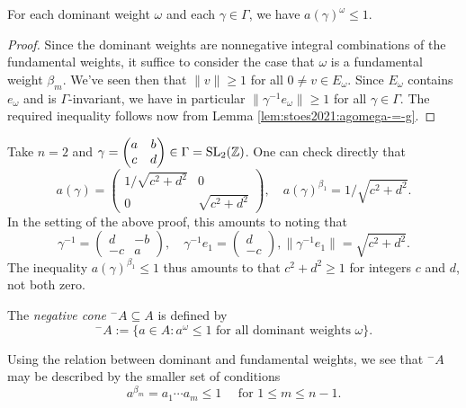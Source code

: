 \documentclass[reqno]{amsart} 
\begin{document}
\begin{lemma}\label{lem:stoes2021:each-dominant-weight}
  For each dominant weight $\omega$ and each $\gamma \in \Gamma$, we have $a(\gamma)^{\omega} \leq 1$.
\end{lemma}
\begin{proof}
  Since the dominant weights are nonnegative integral combinations of the fundamental weights, it suffice to consider the case that $\omega$ is a fundamental weight $\beta_m$.  We've seen then that $\|v\| \geq 1$ for all $0 \neq v \in E_\omega$.  Since $E_\omega$ contains $e_\omega$ and is $\Gamma$-invariant, we have in particular $\|\gamma^{-1} e_\omega \| \geq 1$ for all $\gamma \in \Gamma$.  The required inequality follows now from Lemma \ref{lem:stoes2021:agomega-=-g}.
\end{proof}

\begin{example}
  Take $n = 2$ and $\gamma = 
  \begin{pmatrix}
    a & b \\
    c & d
  \end{pmatrix}
  \in \Gamma = \operatorname{SL}_2(\mathbb{Z})$.  One can check directly that
  \begin{equation*}
    a (\gamma ) = 
    \begin{pmatrix}
      1/ \sqrt{c^2 + d^2} & 0 \\
      0 & \sqrt{c^2 + d^2}
    \end{pmatrix}
    , \quad a(\gamma)^{\beta_1} = 1/ \sqrt{c^2 + d^2}.
  \end{equation*}
  In the setting of the above proof, this amounts to noting that
  \begin{equation*}
    \gamma^{-1} = 
    \begin{pmatrix}
      d & -b \\
      -c & a
    \end{pmatrix}
    , \quad \gamma^{-1} e_1 = 
    \begin{pmatrix}
      d  \\
      -c
    \end{pmatrix}
    , \|\gamma^{-1} e_1\| = \sqrt{c^2 + d^2}.
  \end{equation*}
  The inequality $a(\gamma)^{\beta_1} \leq 1$ thus amounts to that $c^2 + d^2 \geq 1$ for integers $c$ and $d$, not both zero.
\end{example}

\begin{definition}
  The \emph{negative cone} ${}^-A \subseteq A$ is defined by
  \begin{equation*}
    {}^- A := \{a \in A : a^{\omega} \leq 1 \text{ for all dominant weights } \omega \}.
  \end{equation*}
\end{definition}
Using the relation between dominant and fundamental weights, we see that ${}^- A$ may be described by the smaller set of conditions
\begin{equation*}
  a^{\beta_m} = a_1 \dotsb a_m \leq 1 \quad \text{ for } 1 \leq m \leq n-1.
\end{equation*}
\end{document}
